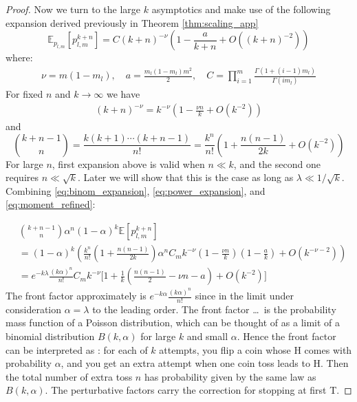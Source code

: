 \documentclass{article}
\theoremstyle{remark} %
\begin{document}
\begin{proof}
Now we turn to the large $k$ asymptotics and make use of the following expansion derived previously in Theorem \ref{thm:scaling_app}
\begin{equation}
\mathbb{E}_{p_{l,m}}[p_{l,m}^{k+n}] = C (k+n)^{-\nu} \left(1 - \frac{a}{k+n}+ O((k+n)^{-2})\right)
\label{eq:moment_refined}
\end{equation}
where:
\begin{align}
\nu = m(1-m_l), \quad 
a = \frac{m_l(1-m_l)m^2}{2}, \quad 
C = \prod_{i=1}^m \frac{\Gamma(1+(i-1)m_l)}{\Gamma(im_l)}
\end{align}
For fixed $n$ and $k \to \infty$ we have
\begin{equation}
\begin{aligned}
(k+n)^{-\nu} = k^{-\nu}\left(1 - \frac{\nu n}{k} + O(k^{-2})\right)
\end{aligned}
\label{eq:power_expansion}
\end{equation}
and 
\begin{equation}
\binom{k+n-1}{n} = \frac{k(k+1)\cdots(k+n-1)}{n!} = \frac{k^n}{n!}\left(1 + \frac{n(n-1)}{2k} + O(k^{-2})\right)
\label{eq:binom_expansion}
\end{equation}
For large $n$, first expansion above is valid when $n \ll k$, and the second one requires $n \ll \sqrt{k}$. Later we will show that this is the case as long as $\lambda \ll 1/\sqrt{k}$.
Combining \eqref{eq:binom_expansion}, \eqref{eq:power_expansion}, and \eqref{eq:moment_refined}:

\begin{equation}
\begin{aligned}
&\binom{k+n-1}{n} \alpha^n (1-\alpha)^k \mathbb{E}[p_{l,m}^{k+n}] \\
&= (1-\alpha)^k\left(\frac{k^n}{n!}\left(1 + \frac{n(n-1)}{2k}\right) \alpha^n C_m k^{-\nu}\left(1 - \frac{\nu n}{k}\right) \left(1 - \frac{a}{k}\right) + O(k^{-\nu-2})\right)\\
&= e^{-k\lambda} \frac{(k\alpha)^n}{n!} C_m k^{-\nu} \Bigg[1 + \frac{1}{k}\left(\frac{n(n-1)}{2} - \nu n - a\right) + O(k^{-2})\Bigg]
\end{aligned}
\end{equation}
The front factor approximately is $e^{-k\alpha} \frac{(k\alpha)^n}{n!}$ since in the limit under consideration $\alpha=\lambda$ to the leading order. The front factor \dots\ is the probability mass function of a Poisson distribution, which can be thought of as a limit of a binomial distribution $B(k, \alpha)$ for large $k$ and small $\alpha$. Hence the front factor can be interpreted as : for each of $k$ attempts, you flip a coin whose H comes with probability $\alpha$, and you get an extra attempt when one coin toss leads to H. Then the total number of extra toss $n$ has probability given by the same law as $B(k, \alpha)$. The perturbative factors carry the correction for stopping at first T. 


\end{proof}
\end{document}
